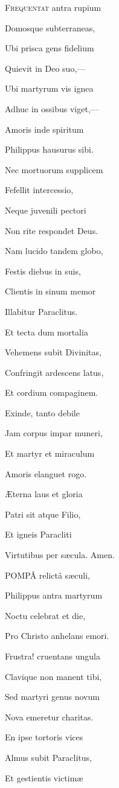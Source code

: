 F\textsc{requentat} antra rupium

Domosque subterraneas,

Ubi prisca gens fidelium

Quievit in Deo suo,—

Ubi martyrum vis ignea

Adhuc in ossibus viget,—

Amoris inde spiritum

Philippus hausurus sibi.

Nec mortuorum supplicem

Fefellit intercessio,

Neque juvenili pectori

Non rite respondet Deus. 

Nam lucido tandem globo,

Festis diebus in suis,

Clientis in sinum memor

Illabitur Paraclitus.

Et tecta dum mortalia

Vehemens subit Divinitas,

Confringit ardescens latus,

Et cordium compaginem.

Exinde, tanto debile

Jam corpus impar muneri,

Et martyr et miraculum

Amoris elanguet rogo.

Æterna laus et gloria

Patri sit atque Filio,

Et igneis Paracliti

Virtutibus per sæcula. Amen.


POMPÂ relictâ sæculi,

Philippus antra martyrum

Noctu celebrat et die,

Pro Christo anhelans emori.

Frustra! cruentans ungula

Clavique non manent tibi,

Sed martyri genus novum

Nova emeretur charitas.

En ipse tortoris vices

Almus subit Paraclitus,

Et gestientis victimæ


